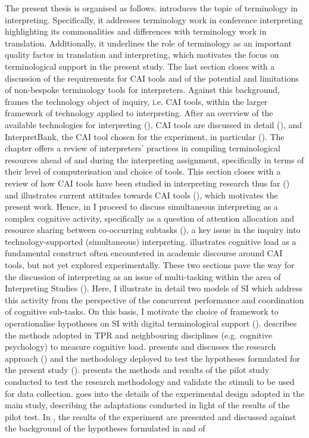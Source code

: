 The present thesis is organised as follows.  introduces the topic of terminology in interpreting. Specifically, it addresses terminology work in conference interpreting highlighting its commonalities and differences with terminology work in translation. Additionally, it underlines the role of terminology as an important quality factor in translation and interpreting, which motivates the focus on terminological support in the present study. The last section closes  with a discussion of the requirements for CAI tools and of the potential and limitations of non-bespoke terminology tools for interpreters. Against this background,  frames the technology object of inquiry, i.e. CAI tools, within the larger framework of technology applied to interpreting. After an overview of the available technologies for interpreting (), CAI tools are discussed in detail (), and InterpretBank, the CAI tool chosen for the experiment, in particular (). The chapter offers a review of interpreters' practices in compiling terminological resources ahead of and during the interpreting assignment, specifically in terms of their level of computerisation and choice of tools. This section closes with a review of how CAI tools have been studied in interpreting research thus far () and illustrates current attitudes towards CAI tools (), which motivates the present work. Hence, in  I proceed to discuss simultaneous interpreting as a complex cognitive activity, specifically as a question of attention allocation and resource sharing between co-occurring subtasks (), a key issue in the inquiry into technology-supported (simultaneous) interpreting.  illustrates cognitive load as a fundamental construct often encountered in academic discourse around CAI tools, but not yet explored experimentally. These two sections pave the way for the discussion of interpreting as an issue of multi-tasking within the area of Interpreting Studies (). Here, I illustrate in detail two models of SI which address this activity from the perspective of the concurrent performance and coordination of cognitive sub-tasks. On this basis, I motivate the choice of framework to operationalise hypotheses on SI with digital terminological support ().  describes the methods adopted in TPR and neighbouring disciplines (e.g. cognitive psychology) to measure cognitive load.  presents and discusses the research approach () and the methodology deployed to test the hypotheses formulated for the present study ().  presents the methods and results of the pilot study conducted to test the research methodology and validate the stimuli to be used for data collection.  goes into the details of the experimental design adopted in the main study, describing the adaptations conducted in light of the results of the pilot test. In , the results of the experiment are presented and discussed against the background of the hypotheses formulated in  and of 